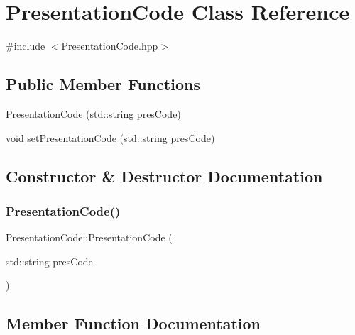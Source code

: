 \hypertarget{class_presentation_code}{}\section{Presentation\+Code Class Reference}
\label{class_presentation_code}


{\ttfamily \#include $<$Presentation\+Code.\+hpp$>$}

\subsection*{Public Member Functions}
\begin{DoxyCompactItemize}
\item 
\mbox{\hyperlink{class_presentation_code_a43a63ec18cb376608d60b9ff0e578444}{Presentation\+Code}} (std\+::string pres\+Code)
\item 
void \mbox{\hyperlink{class_presentation_code_a867e2a8c5da78c3eaabb9ed8918f9521}{set\+Presentation\+Code}} (std\+::string pres\+Code)
\end{DoxyCompactItemize}


\subsection{Constructor \& Destructor Documentation}
\mbox{\label{class_presentation_code_a43a63ec18cb376608d60b9ff0e578444}} 
\subsubsection{\texorpdfstring{PresentationCode()}{PresentationCode()}}
{\footnotesize\ttfamily Presentation\+Code\+::\+Presentation\+Code (\begin{DoxyParamCaption}\item[{std\+::string}]{pres\+Code }\end{DoxyParamCaption})}



\subsection{Member Function Documentation}
\mbox{\label{class_presentation_code_a867e2a8c5da78c3eaabb9ed8918f9521}} 
